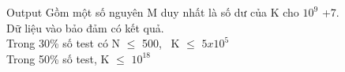 Output
Gồm một số nguyên M duy nhất là số dư của K cho $10^{9}$ +7.
\\Dữ liệu vào bảo đảm có kết quả.
\\Trong 30\% số test có N  $\le$  500,  K  $\le$  $5x10^{5}$
\\Trong 50\% số test, K  $\le$  $10^{18}$